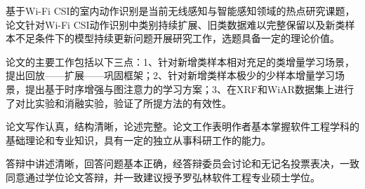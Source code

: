 基于Wi-Fi CSI的室内动作识别是当前无线感知与智能感知领域的热点研究课题，论文针对Wi-Fi CSI动作识别中类别持续扩展、旧类数据难以完整保留以及新类样本不足条件下的模型持续更新问题开展研究工作，选题具备一定的理论价值。

论文的主要工作包括以下三点：1、针对新增类样本相对充足的类增量学习场景，提出回放——扩展——巩固框架；2、针对新增类样本极少的少样本增量学习场景，提出基于时序增强与图注意力的学习方案；3、在XRF和WiAR数据集上进行了对比实验和消融实验，验证了所提方法的有效性。

论文写作认真，结构清晰，论述完整。论文工作表明作者基本掌握软件工程学科的基础理论和专业知识，具有一定的独立从事科研工作的能力。

答辩中讲述清晰，回答问题基本正确，经答辩委员会讨论和无记名投票表决，一致同意通过学位论文答辩，并一致建议授予罗弘林软件工程专业硕士学位。
